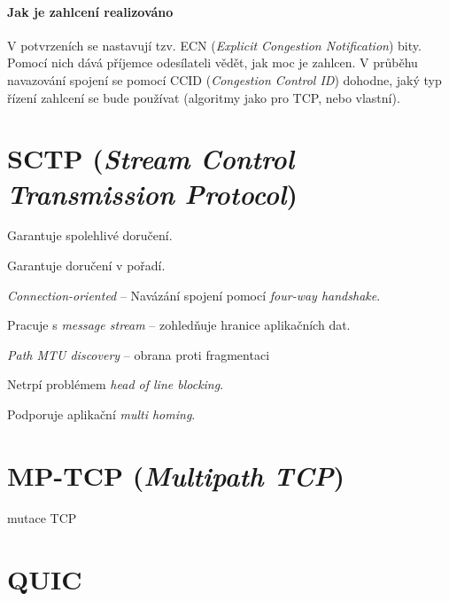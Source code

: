 \paragraph*{Jak je zahlcení realizováno} V potvrzeních se nastavují tzv. ECN (\textit{Explicit Congestion Notification}) bity. Pomocí nich dává příjemce odesílateli vědět, jak moc je zahlcen. V průběhu navazování spojení se pomocí CCID (\textit{Congestion Control ID}) dohodne, jaký typ řízení zahlcení se bude používat (algoritmy jako pro TCP, nebo vlastní).


\section{SCTP (\textit{Stream Control Transmission Protocol})}

\begin{compactitem}
    \item Garantuje spolehlivé doručení.
    \item Garantuje doručení v pořadí.
    \item \textit{Connection-oriented} -- Navázání spojení pomocí \textit{four-way handshake}.
    \item Pracuje s \textit{message stream} -- zohledňuje hranice aplikačních dat.
    \item \textit{Path MTU discovery} -- obrana proti fragmentaci
    \item Netrpí problémem \textit{head of line blocking}.
    \item Podporuje aplikační \textit{multi homing}.
\end{compactitem}



\section{MP-TCP (\textit{Multipath TCP})}


mutace TCP


\section{QUIC}

